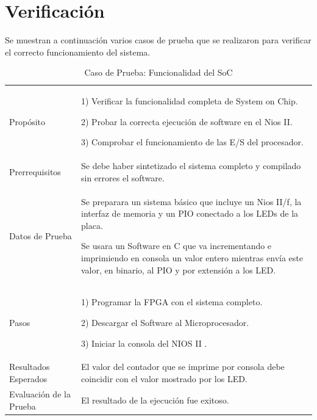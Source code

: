 \section{Verificación}
Se muestran a continuación varios casos de prueba que se realizaron para verificar el correcto funcionamiento del sistema.
\begin{table}
	\begin{tabular}{|>{\columncolor[gray]{0.8}}l|p{11cm}|} \hline
\multicolumn{2}{|>{\columncolor[gray]{0.8}}l|}{\textbf{Caso de Prueba: Funcionalidad del SoC}}\\ \hline
Propósito  & 1) Verificar la funcionalidad completa de System on Chip. 

2) Probar la correcta ejecución de software en el Nios II.

3) Comprobar el funcionamiento de las E/S del procesador. 
\\ \hline
 Prerrequisitos  & Se debe haber sintetizado el sistema completo y compilado sin errores el software.\\ \hline
 Datos de Prueba & Se preparara un sistema básico que incluye un Nios II/f, la interfaz de memoria y un PIO conectado a los LEDs de la placa.

Se usara un Software en C que va incrementando e imprimiendo en consola un valor entero mientras envía este valor, en binario, al PIO y por extensión a los LED.  \\ \hline
 Pasos & 1) Programar la FPGA con el sistema completo.

2) Descargar el Software al Microprocesador.

3) Iniciar la consola del NIOS II .\\ \hline
 Resultados Esperados & El valor del contador que se imprime por consola debe coincidir con el valor mostrado por los LED.\\ \hline
 Evaluación de la Prueba  & El resultado de la ejecución fue exitoso. \\ \hline
	\end{tabular}
	\caption{Caso de Prueba: Funcionalidad del SoC}
	\label{tab:testsoc}
\end{table}
